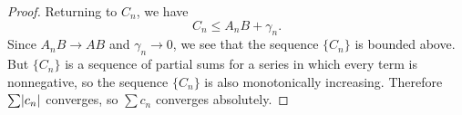 \begin{proof}
  Returning to $C_n$, we have
  \begin{equation*}
    C_n \leq A_nB + \gamma_n.
  \end{equation*}
  Since $A_nB\to AB$ and $\gamma_n\to0$, we see that the sequence
  $\{C_n\}$ is bounded above. But $\{C_n\}$ is a sequence of partial
  sums for a series in which every term is nonnegative, so the
  sequence $\{C_n\}$ is also monotonically increasing. Therefore
  $\sum\lvert{c_n}\rvert$ converges, so $\sum c_n$ converges absolutely.
\end{proof}


